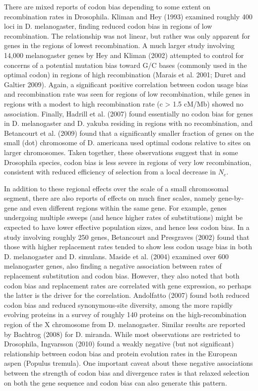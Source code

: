 \documentclass{article}
\begin{document}
There are mixed reports of codon bias depending to some extent on recombination rates in Drosophila. Kliman and Hey (1993) examined roughly 400 loci in D. melanogaster, finding reduced codon bias in regions of low recombination. The relationship was not linear, but rather was only apparent for genes in the regions of lowest recombination. A much larger study involving 14,000 melanogaster genes by Hey and Kliman (2002) attempted to control for concerns of a potential mutation bias toward G/C bases (commonly used in the optimal codon) in regions of high recombination (Marais et al. 2001; Duret and Galtier 2009). Again, a significant positive correlation between codon usage bias and recombination rate was seen for regions of low recombination, while genes in regions with a modest to high recombination rate (c > 1.5 cM/Mb) showed no association. Finally, Hadrill et al. (2007) found essentially no codon bias for genes in D. melanogaster and D. yakuba residing in regions with no recombination, and Betancourt et al. (2009) found that a significantly smaller fraction of genes on the small (dot) chromosome of D. americana used optimal codons relative to sites on larger chromosomes. Taken together, these observations suggest that in some Drosophila species, codon bias is less severe in regions of very low recombination, consistent with reduced efficiency of selection from a local decrease in  $ N_{e} $.

In addition to these regional effects over the scale of a small chromosomal segment, there are also reports of effects on much finer scales, namely gene-by-gene and even different regions within the same gene. For example, genes undergoing multiple sweeps (and hence higher rates of substitutions) might be expected to have lower effective population sizes, and hence less codon bias. In a study involving roughly 250 genes, Betancourt and Presgraves (2002) found that those with higher replacement rates tended to show less codon usage bias in both D. melanogaster and D. simulans. Maside et al. (2004) examined over 600 melanogaster genes, also finding a negative association between rates of replacement substitution and codon bias. However, they also noted that both codon bias and replacement rates are correlated with gene expression, so perhaps the latter is the driver for the correlation. Andolfatto (2007) found both reduced codon bias and reduced synonymous-site diversity, among the more rapidly evolving proteins in a survey of roughly 140 proteins on the high-recombination region of the X chromosome from D. melanogaster. Similar results are reported by Bachtrog (2008) for D. miranda. While most observations are restricted to Drosophila, Ingvarsson (2010) found a weakly negative (but not significant) relationship between codon bias and protein evolution rates in the European aspen (Populus tremula). One important caveat about these negative associations between the strength of codon bias and divergence rates is that relaxed selection on both the gene sequence and codon bias can also generate this pattern.
\end{document}
